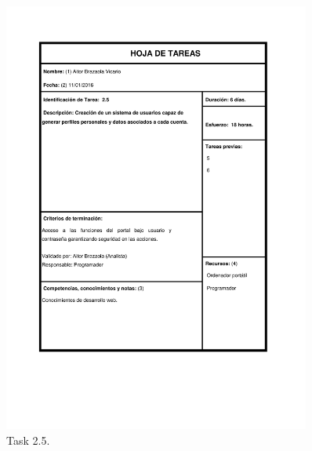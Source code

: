 \documentclass{DeustoFDP}
\begin{document}
\begin{figure}[H]
	\centering
	\includegraphics[width=0.9\textwidth]{fig/Tareas/25}
	\caption{Task 2.5.}
	\label{fig:t25}
\end{figure}
\end{document}
